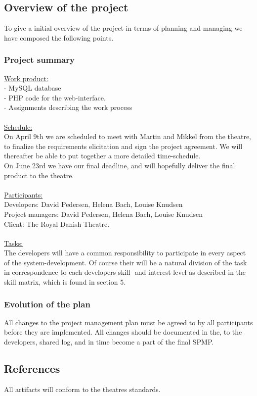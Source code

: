 \documentclass[12pt]{article}
\begin{document}
\subsection{Overview of the project}
To give a initial overview of the project in terms of planning and managing we have composed the following points.
\subsubsection{Project summary}
\underline{Work product:} \\
- MySQL database \\
- PHP code for the web-interface. \\
- Assignments describing the work process\\\\
\underline{Schedule:} \\
On April 9th we are scheduled to meet with Martin and Mikkel from the theatre, to finalize the requirements elicitation and sign the project agreement. We will thereafter be able to put together a more detailed time-schedule.\\
On June 23rd we have our final deadline, and will hopefully deliver the final product to the theatre. \\\\
\underline{Participants:}\\
Developers: David Pedersen, Helena Bach, Louise Knudsen \\
Project managers: David Pedersen, Helena Bach, Louise Knudsen \\
Client: The Royal Danish Theatre.\\\\
\underline{Tasks:} \\
The developers will have a common responsibility to participate in every aspect of the system-development. Of course their will be a natural division of the task in correspondence to each developers skill- and interest-level as described in the skill matrix, which is found in section 5. 
\subsubsection{Evolution of the plan}
All changes to the project management plan must be agreed to by all participants before they are implemented. All changes should be documented in the, to the developers, shared log, and in time become a part of the final SPMP.
\subsection{References}
All artifacts will conform to the theatres standards.
\end{document}
